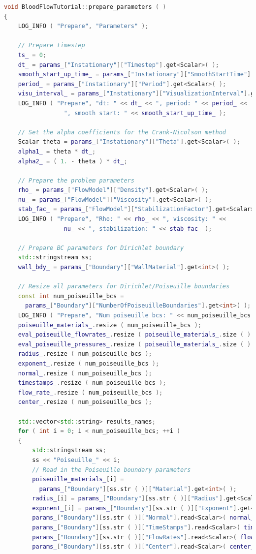 \documentclass[a4paper, 11pt, twoside]{article}
\begin{document}
\begin{lstlisting}[language=C++, basicstyle={\footnotesize, \ttfamily}, keywordstyle=\color{blue},  numbers=none, tabsize=4]
void BloodFlowTutorial::prepare_parameters ( )
{
    LOG_INFO ( "Prepare", "Parameters" );

    // Prepare timestep
    ts_ = 0;
    dt_ = params_["Instationary"]["Timestep"].get<Scalar>( );
    smooth_start_up_time_ = params_["Instationary"]["SmoothStartTime"].get<Scalar>( );
    period_ = params_["Instationary"]["Period"].get<Scalar>( );
    visu_interval_ = params_["Instationary"]["VisualizationInterval"].get<int>( );
    LOG_INFO ( "Prepare", "dt: " << dt_ << ", period: " << period_ <<
    			 ", smooth start: " << smooth_start_up_time_ );

    // Set the alpha coefficients for the Crank-Nicolson method
    Scalar theta = params_["Instationary"]["Theta"].get<Scalar>( );
    alpha1_ = theta * dt_;
    alpha2_ = ( 1. - theta ) * dt_;

    // Prepare the problem parameters
    rho_ = params_["FlowModel"]["Density"].get<Scalar>( );
    nu_ = params_["FlowModel"]["Viscosity"].get<Scalar>( );
    stab_fac_ = params_["FlowModel"]["StabilizationFactor"].get<Scalar>( );
    LOG_INFO ( "Prepare", "Rho: " << rho_ << ", viscosity: " << 
    			 nu_ << ", stabilization: " << stab_fac_ );

    // Prepare BC parameters for Dirichlet boundary
    std::stringstream ss;
    wall_bdy_ = params_["Boundary"]["WallMaterial"].get<int>( );

    // Resize all parameters for Dirichlet/Poiseuille boundaries
    const int num_poiseuille_bcs = 
      params_["Boundary"]["NumberOfPoiseuilleBoundaries"].get<int>( );
    LOG_INFO ( "Prepare", "Num poiseuille bcs: " << num_poiseuille_bcs );
    poiseuille_materials_.resize ( num_poiseuille_bcs );
    eval_poiseuille_flowrates_.resize ( poiseuille_materials_.size ( ) );
    eval_poiseuille_pressures_.resize ( poiseuille_materials_.size ( ) );
    radius_.resize ( num_poiseuille_bcs );
    exponent_.resize ( num_poiseuille_bcs );
    normal_.resize ( num_poiseuille_bcs );
    timestamps_.resize ( num_poiseuille_bcs );
    flow_rate_.resize ( num_poiseuille_bcs );
    center_.resize ( num_poiseuille_bcs );

    std::vector<std::string> results_names;
    for ( int i = 0; i < num_poiseuille_bcs; ++i )
    {
        std::stringstream ss;
        ss << "Poiseuille_" << i;
        // Read in the Poiseuille boundary parameters
        poiseuille_materials_[i] = 
          params_["Boundary"][ss.str ( )]["Material"].get<int>( );
        radius_[i] = params_["Boundary"][ss.str ( )]["Radius"].get<Scalar>( );
        exponent_[i] = params_["Boundary"][ss.str ( )]["Exponent"].get<int>( );
        params_["Boundary"][ss.str ( )]["Normal"].read<Scalar>( normal_[i] );
        params_["Boundary"][ss.str ( )]["TimeStamps"].read<Scalar>( timestamps_[i] );
        params_["Boundary"][ss.str ( )]["FlowRates"].read<Scalar>( flow_rate_[i] );
        params_["Boundary"][ss.str ( )]["Center"].read<Scalar>( center_[i] );


\end{lstlisting}
\end{document}
